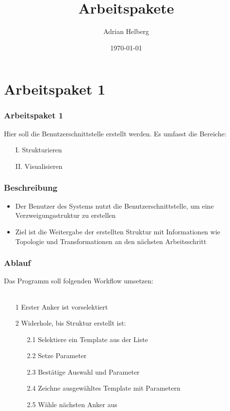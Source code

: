\documentclass[12pt]{beamer}
\title{Arbeitspakete}
\author{Adrian Helberg}
\date{\today}
\begin{document}
    \maketitle

    \section{Arbeitspaket 1}
    \label{sec:1}

    \begin{frame}
        \frametitle{Arbeitspaket 1}
        Hier soll die Benutzerschnittstelle erstellt werden.
        Es umfasst die Bereiche:
        \begin{itemize}
            \item[I.] Strukturieren
            \item[II.] Visualisieren
        \end{itemize}
    \end{frame}

    \begin{frame}
        \frametitle{Beschreibung}
        \begin{itemize}
            \setlength\itemsep{1em}
            \item Der Benutzer des Systems nutzt die Benutzerschnittstelle, um eine Verzweigungsstruktur zu erstellen
            \item Ziel ist die Weitergabe der erstellten Struktur mit Informationen wie Topologie und Transformationen an den
            nächsten Arbeitsschritt
        \end{itemize}
    \end{frame}

    \begin{frame}[fragile]
        \frametitle{Ablauf}
        Das Programm soll folgenden Workflow umsetzen:\\~\\
        \begin{itemize}
            \item[1] Erster Anker ist vorselektiert
            \item[2] Widerhole, bis Struktur erstellt ist:
            \begin{itemize}
                \item[2.1] Selektiere ein Template aus der Liste
                \item[2.2] Setze Parameter
                \item[2.3] Bestätige Auswahl und Parameter
                \item[2.4] Zeichne ausgewähltes Template mit Parametern
                \item[2.5] Wähle nächsten Anker aus
            \end{itemize}
        \end{itemize}
    \end{frame}
\end{document}

